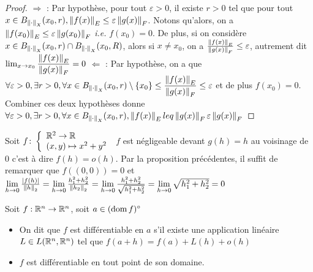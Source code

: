      \begin{proof}
             $\Rightarrow$ : Par hypothèse, pour tout $\varepsilon>0$, il existe $r>0$ tel que pour tout $x\in B_{\left\| \cdot \right\|_X}(x_0, r), \left\| f(x) \right\|_E\leq \varepsilon\left\| g(x) \right\|_F$. Notons qu'alors, on a $\left\| f(x_0) \right\|_E\leq \varepsilon\left\| g(x_0) \right\|_F$ \textit{i.e.} $f(x_0)=0$. De plus, si on considère $x\in B_{\left\| \cdot \right\|_X}(x_0, r)\cap B_{\left\| \cdot \right\|_X}(x_0, R)$, alors si $x\ne x_0$, on a $\frac{\left\| f(x) \right\|_E}{\left\| g(x) \right\|_F}\leq \varepsilon$, autrement dit 
             $\lim_{x\to x_0}\dfrac{\left\| f(x) \right\|_E}{\left\| g(x) \right\|_F} = 0\\$
             $\Leftarrow$ : Par hypothèse, on a que $\forall \varepsilon>0,\exists r >0, \forall x \in B_{\left\| \cdot \right\|_X}(x_0, r)\setminus\{x_0\}\leq \dfrac{\left\| f(x) \right\|_E}{\left\| g(x) \right\|_F}\leq \varepsilon$ et de plus $f(x_0)=0$. Combiner ces deux hypothèses donne $\forall \varepsilon>0,\exists r >0, \forall x \in B_{\left\| \cdot \right\|_X}(x_0, r), \left\| f(x) \right\|_E\\leq\left\| g(x) \right\|_F \varepsilon\left\| g(x) \right\|_F$
         \end{proof}
         \begin{exemple}
             Soit $f\colon \left\{\begin{array}{l}\mathbb{R}^2\to \mathbb{R} \\(x,y)\mapsto x^2+y^2\end{array}\right.$ $f$ est négligeable devant $g(h)=h$ au voisinage de $0$ c'est à dire $f(h)=o(h)$. Par la proposition précédentes, il suffit de remarquer que $f((0,0))=0$ et $\lim\limits_{h\to 0}\frac{|f(h)|}{\left\| h \right\|_2}=\lim\limits_{h\to 0}\frac{h_1^2+h_2^2}{\left\| h_2 \right\|_2}=\lim\limits_{h\to 0}\frac{h_1^2+h_2^2}{\sqrt{h_1^2+h_2^2}}= \lim\limits_{h\to 0}\sqrt{h_1^2+h_2^2}=0$
         \end{exemple}
         \begin{definition}
             Soit $f:\mathbb{R}^n\to \mathbb{R}^n$, soit $a\in (\operatorname{dom} f)^\circ$
             \begin{itemize}
                 \item On dit que $f$ est différentiable en $a$ s'il existe une application linéaire $L\in L(\mathbb{R}^n,\mathbb{R}^n)$ tel que $f(a+h)= f(a)+L(h)+o(h)$
                 \item $f$ est différentiable en tout point de son domaine.
             \end{itemize}
         \end{definition}
